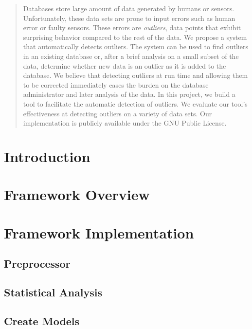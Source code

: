 \documentclass{vldb}
\begin{document}
\maketitle

\begin{abstract}
Databases store large amount of data generated by humans or sensors.
Unfortunately, these data sets are prone to input errors such as human error or faulty sensors.
These errors are \emph{outliers}, data points that exhibit surprising behavior compared to the rest of the data.
We propose a system that automatically detects outliers.
The system can be used to find outliers in an existing database or, after a brief analysis on a small subset of the data, determine whether new data is an outlier as it is added to the database.
We believe that detecting outliers at run time and allowing them to be corrected immediately eases the burden on the database administrator and later analysis of the data.
In this project, we build a tool to facilitate the automatic detection of outliers.
We evaluate our tool's effectiveness at detecting outliers on a variety of data sets.
Our implementation is publicly available under the GNU Public License.
\end{abstract}

\section{Introduction}
\label{sec:intro}


\section{Framework Overview}
\label{sec:overview}

\section{Framework Implementation}
\label{sec:implementation}
\subsection{Preprocessor}
\label{sec:preproc}

\subsection{Statistical Analysis}
\label{sec:stat_anal}

\subsection{Create Models}
\label{sec:model_creation}

\end{document}
